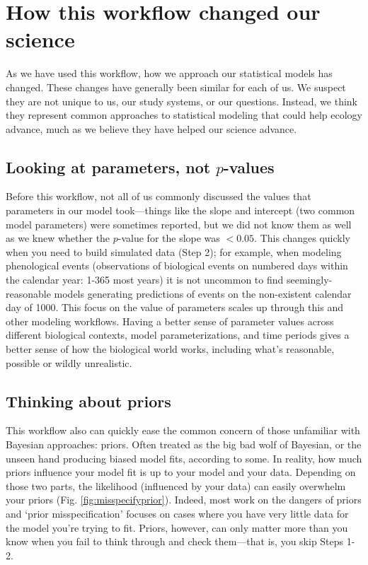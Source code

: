 \documentclass[11pt]{article}
\begin{document}
\section*{How this workflow changed our science} 

As we have used this workflow, how we approach our statistical models has changed. These changes have generally been similar for each of us. We suspect they are not unique to us, our study systems, or our questions. Instead, we think they represent common approaches to statistical modeling that could help ecology advance, much as we believe they have helped our science advance. 

 \subsection*{Looking at parameters, not $p$-values} 
Before this workflow, not all of us commonly discussed the values that parameters in our model took---things like the slope and intercept (two common model parameters) were sometimes reported, but we did not know them as well as we knew whether the $p$-value for the slope was $<0.05$. This changes quickly when you need to build simulated data (Step 2); for example, when modeling phenological events (observations of biological events on numbered days within the calendar year: 1-365 most years) it is not uncommon to find seemingly-reasonable models generating predictions of events on the non-existent calendar day of 1000. This focus on the value of parameters scales up through this and other modeling workflows. Having a better sense of parameter values across different biological contexts, model parameterizations, and time periods gives a better sense of how the biological world works, including what's reasonable, possible or wildly unrealistic. 

 \subsection*{Thinking about priors} 
This workflow also can quickly ease the common concern of those unfamiliar with Bayesian approaches: priors. Often treated as the big bad wolf of Bayesian, or the unseen hand producing biased model fits, according to some. In reality, how much priors influence your model fit is up to your model and your data. Depending on those two parts, the likelihood (influenced by your data) can easily overwhelm your priors (Fig. \ref{fig:misspecifyprior}). Indeed, most work on the dangers of priors and `prior misspecification'  focuses on cases where you have very little data for the model you're trying to fit. Priors, however, can only matter more than you know when you fail to think through and check them---that is, you skip Steps 1-2. 
\end{document}

